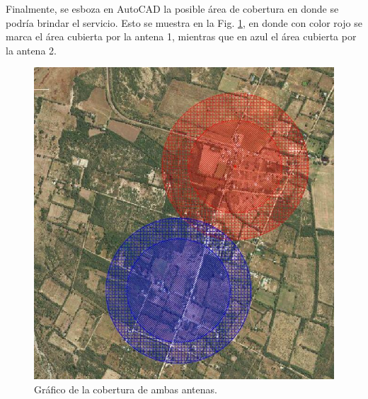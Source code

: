\documentclass[11pt,a4paper]{article}
\begin{document}
\begin{table}[htbp]
\caption{Posible área de cobertura del servicio para 5 GHz.}
\label{}
\end{table}

Finalmente, se esboza en AutoCAD la posible área de cobertura en donde se podría brindar el servicio. 
Esto se muestra en la Fig. \ref{fig:grafico_cobertura}, en donde con color rojo se marca el área cubierta por la antena 1, mientras que en azul el área cubierta por la antena 2.

\begin{figure}[htbp]
  \centering
  \includegraphics[width=0.8\linewidth]{fotos_ema/grafico_cobertura.jpg}
  \caption{Gráfico de la cobertura de ambas antenas.}
  \label{fig:grafico_cobertura}
\end{figure}
\end{document}
